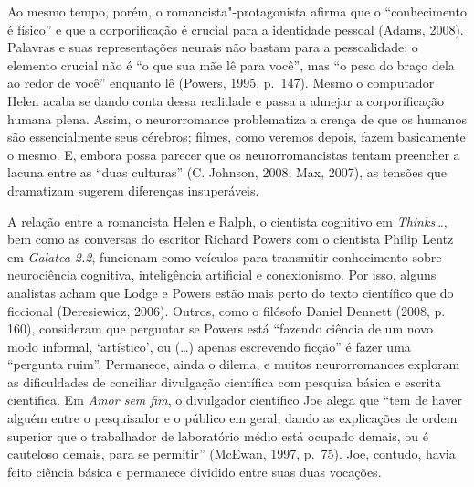 Ao mesmo tempo, porém, o romancista"-protagonista afirma que o
``conhecimento é físico'' e que a corporificação é crucial para a
identidade pessoal (Adams, 2008). Palavras e suas representações neurais
não bastam para a pessoalidade: o elemento crucial não é ``o que sua mãe
lê para você'', mas ``o peso do braço dela ao redor de você'' enquanto
lê (Powers, 1995, p.~147). Mesmo o computador Helen acaba se dando conta
dessa realidade e passa a almejar a corporificação humana plena. Assim,
o neurorromance problematiza a crença de que os humanos são
essencialmente seus cérebros; filmes, como veremos depois, fazem
basicamente o mesmo. E, embora possa parecer que os neurorromancistas
tentam preencher a lacuna entre as ``duas culturas'' (C. Johnson, 2008;
Max, 2007), as tensões que dramatizam sugerem diferenças insuperáveis.

A relação entre a romancista Helen e Ralph, o cientista cognitivo em
\emph{Thinks\ldots{}}, bem como as conversas do escritor Richard Powers com o
cientista Philip Lentz em \emph{Galatea 2.2}, funcionam como veículos
para transmitir conhecimento sobre neurociência cognitiva, inteligência
artificial e conexionismo. Por isso, alguns analistas acham que Lodge e
Powers estão mais perto do texto científico que do ficcional
(Deresiewicz, 2006). Outros, como o filósofo Daniel Dennett (2008, p.
160), consideram que perguntar se Powers está ``fazendo ciência de um
novo modo informal, `artístico', ou (\ldots{}) apenas escrevendo ficção'' é
fazer uma ``pergunta ruim''. Permanece, ainda o dilema, e muitos
neurorromances exploram as dificuldades de conciliar divulgação
científica com pesquisa básica e escrita científica. Em \emph{Amor sem
fim}, o divulgador científico Joe alega que ``tem de haver alguém entre
o pesquisador e o público em geral, dando as explicações de ordem
superior que o trabalhador de laboratório médio está ocupado demais, ou
é cauteloso demais, para se permitir'' (McEwan, 1997, p.~75). Joe,
contudo, havia feito ciência básica e permanece dividido entre suas duas
vocações.

